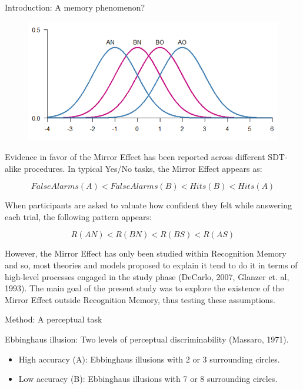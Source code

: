 \documentclass[final]{beamer}
\newlength{\onecolwid}
\begin{document}
\begin{frame}[t]
\begin{columns}[t]
\begin{column}{\onecolwid}
\begin{alertblock}{Introduction: A memory phenomenon?}
\begin{figure}
\includegraphics[width=0.5\linewidth]{Figures/MirrorEffect.png}
\end{figure}

Evidence in favor of the Mirror Effect has been reported across different SDT-alike procedures. In typical Yes/No tasks, the Mirror Effect appears as:

\begin{equation}
FalseAlarms(A) < FalseAlarms(B) < Hits(B) < Hits(A)
\label{eqn:Rates}
\end{equation}

When participants are asked to valuate how confident they felt while answering each trial, the following pattern appears:

\begin{equation}
R(AN) < R(BN) < R(BS) < R(AS)
\label{eqn:Confidence}
\end{equation}

However, the Mirror Effect has only been studied within Recognition Memory and so, most theories and models proposed to explain it tend to do it in terms of high-level processes engaged in the study phase (DeCarlo, 2007, Glanzer et. al, 1993). The main goal of the present study was to explore the existence of the Mirror Effect outside Recognition Memory, thus testing these assumptions. 
\end{alertblock}



\begin{alertblock}{Method: A perceptual task}

Ebbinghaus illusion: Two levels of perceptual discriminability (Massaro, 1971).

\begin{itemize}
\item High accuracy (A): Ebbinghaus illusions with 2 or 3 surrounding circles.
\item Low accuracy (B): Ebbinghaus illusions with 7 or 8 surrounding circles.
\end{itemize}


\end{alertblock}
\end{column}
\end{columns}
\end{frame}
\end{document}
